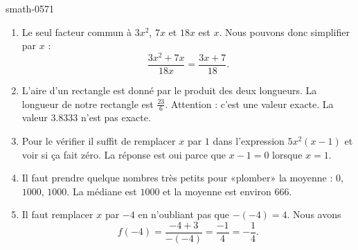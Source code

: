 
\begin{corrige}{smath-0571}

    \begin{enumerate}
        \item
            Le seul facteur commun à \( 3x^2\), \( 7x\) et \( 18x\) est \( x\). Nous pouvons donc simplifier par \( x\) :
            \begin{equation}
                \frac{ 3x^2+7x }{ 18x }=\frac{ 3x+7 }{ 18 }.
            \end{equation}
        \item
            L'aire d'un rectangle est donné par le produit des deux longueurs. La longueur de notre rectangle est \( \frac{ 23 }{ 6 }\)\centi\meter. Attention : c'est une valeur exacte. La valeur \( 3.8333\) n'est pas exacte.
        \item 
            Pour le vérifier il suffit de remplacer \( x\) par \( 1\) dans l'expression \( 5x^2(x-1)\) et voir si ça fait zéro. La réponse est oui parce que \( x-1=0\) lorsque \( x=1\).
        \item
            Il faut prendre quelque nombres très petits pour «plomber» la moyenne : \( 0\), \( 1000\), \( 1000\). La médiane est \( 1000\) et la moyenne est environ \( 666\).
        \item
            Il faut remplacer \( x\) par \( -4\) en n'oubliant pas que \( -(-4)=4\). Nous avons
            \begin{equation}
                f(-4)=\frac{ -4+3 }{ -(-4) }=\frac{ -1 }{ 4 }=-\frac{1}{ 4 }.
            \end{equation}
    \end{enumerate}

\end{corrige}

